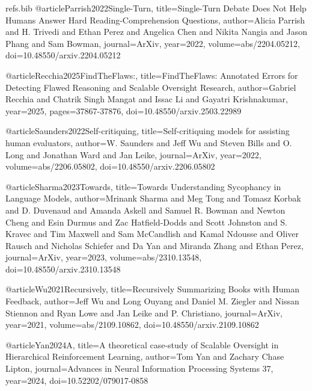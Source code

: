 \begin{filecontents}{refs.bib}
@article{Parrish2022Single-Turn,
title={Single-Turn Debate Does Not Help Humans Answer Hard Reading-Comprehension Questions},
author={Alicia Parrish and H. Trivedi and Ethan Perez and Angelica Chen and Nikita Nangia and Jason Phang and Sam Bowman},
journal={ArXiv},
year={2022},
volume={abs/2204.05212},
doi={10.48550/arxiv.2204.05212}
}

@article{Recchia2025FindTheFlaws:,
title={FindTheFlaws: Annotated Errors for Detecting Flawed Reasoning and Scalable Oversight Research},
author={Gabriel Recchia and Chatrik Singh Mangat and Issac Li and Gayatri Krishnakumar},
year={2025},
pages={37867-37876},
doi={10.48550/arxiv.2503.22989}
}

@article{Saunders2022Self-critiquing,
title={Self-critiquing models for assisting human evaluators},
author={W. Saunders and Jeff Wu and Steven Bills and O. Long and Jonathan Ward and Jan Leike},
journal={ArXiv},
year={2022},
volume={abs/2206.05802},
doi={10.48550/arxiv.2206.05802}
}

@article{Sharma2023Towards,
title={Towards Understanding Sycophancy in Language Models},
author={Mrinank Sharma and Meg Tong and Tomasz Korbak and D. Duvenaud and Amanda Askell and Samuel R. Bowman and Newton Cheng and Esin Durmus and Zac Hatfield-Dodds and Scott Johnston and S. Kravec and Tim Maxwell and Sam McCandlish and Kamal Ndousse and Oliver Rausch and Nicholas Schiefer and Da Yan and Miranda Zhang and Ethan Perez},
journal={ArXiv},
year={2023},
volume={abs/2310.13548},
doi={10.48550/arxiv.2310.13548}
}

@article{Wu2021Recursively,
title={Recursively Summarizing Books with Human Feedback},
author={Jeff Wu and Long Ouyang and Daniel M. Ziegler and Nissan Stiennon and Ryan Lowe and Jan Leike and P. Christiano},
journal={ArXiv},
year={2021},
volume={abs/2109.10862},
doi={10.48550/arxiv.2109.10862}
}

@article{Yan2024A,
title={A theoretical case-study of Scalable Oversight in Hierarchical Reinforcement Learning},
author={Tom Yan and Zachary Chase Lipton},
journal={Advances in Neural Information Processing Systems 37},
year={2024},
doi={10.52202/079017-0858}
}
\end{filecontents}

\documentclass{article}
\usepackage{adjustbox}


\section*{Judging \textbf{can beat choosing} when \textbf{errors are legible}, but recursion helps only if it adds \textbf{uncorrelated checks}.}


